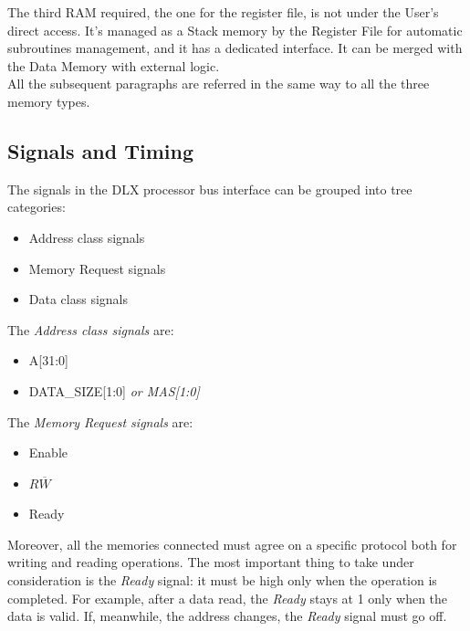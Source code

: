 The third RAM required, the one for the register file, is not under the User's direct access. It's managed as a Stack memory by the Register File for automatic subroutines management, and it has a dedicated interface. It can be merged with the Data Memory with external logic.\\

All the subsequent paragraphs are referred in the same way to all the three memory types.

\subsection{Signals and Timing}
The signals in the DLX processor bus interface can be grouped into tree categories:
\begin{itemize}
    \itemsep0sp
    \item Address class signals
    \item Memory Request signals
    \item Data class signals
\end{itemize}

The \emph{Address class signals} are:
\begin{itemize}
    \itemsep0sp
    \item A{[31:0]}
    \item DATA\_SIZE{[1:0]} \emph{or MAS{[1:0]}}
\end{itemize}

The \emph{Memory Request signals} are:
\begin{itemize}
    \itemsep0sp
    \item Enable
    \item $R\overline{W}$
    \item Ready
\end{itemize}

Moreover, all the memories connected must agree on a specific protocol both for writing and reading operations. The most important thing to take under consideration is the \emph{Ready} signal: it must be high only when the operation is completed. For example, after a data read, the \emph{Ready} stays at 1 only when the data is valid. If, meanwhile, the address changes, the \emph{Ready} signal must go off.

